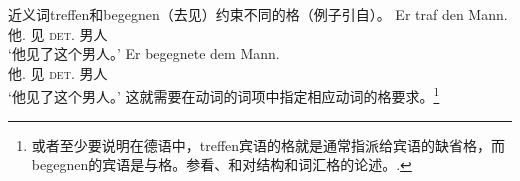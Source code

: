 \begin{exe}
\begin{xlist}[iv.]
\begin{exe}
\begin{xlist}[iv.]
\zl
近义词treffen和begegnen（去见）约束不同的格（例子引自\citet[]{ps}）。
\eal
\ex 
\gll Er traf den Mann.\\
     他.\nom{} 见 \textsc{det}.\acc{} 男人\\
\glt `他见了这个男人。'
\ex 
\gll Er begegnete dem Mann.\\
     他.\nom{} 见 \textsc{det}.\dat{} 男人\\
\glt `他见了这个男人。'
\zl
这就需要在动词的词项中指定相应动词的格要求。\footnote{%
  或者至少要说明在德语中，treffen宾语的格就是通常指派给宾语的缺省格，而begegnen的宾语是与格。参看、和对结构和词汇格的论述。.
}
%


\end{xlist}
\end{exe}
\end{xlist}
\end{exe}

